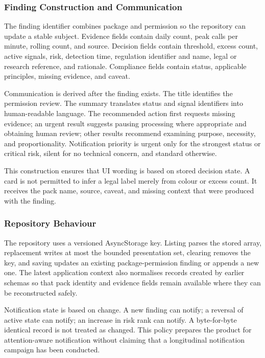 \subsubsection{Finding Construction and Communication}

The finding identifier combines package and permission so the repository can update a stable subject. Evidence fields contain daily count, peak calls per minute, rolling count, and source. Decision fields contain threshold, excess count, active signals, risk, detection time, regulation identifier and name, legal or research reference, and rationale. Compliance fields contain status, applicable principles, missing evidence, and caveat.

Communication is derived after the finding exists. The title identifies the permission review. The summary translates status and signal identifiers into human-readable language. The recommended action first requests missing evidence; an urgent result suggests pausing processing where appropriate and obtaining human review; other results recommend examining purpose, necessity, and proportionality. Notification priority is urgent only for the strongest status or critical risk, silent for no technical concern, and standard otherwise.

This construction ensures that UI wording is based on stored decision state. A card is not permitted to infer a legal label merely from colour or excess count. It receives the pack name, source, caveat, and missing context that were produced with the finding.

\subsubsection{Repository Behaviour}

The repository uses a versioned AsyncStorage key. Listing parses the stored array, replacement writes at most the bounded presentation set, clearing removes the key, and saving updates an existing package-permission finding or appends a new one. The latest application context also normalises records created by earlier schemas so that pack identity and evidence fields remain available where they can be reconstructed safely.

Notification state is based on change. A new finding can notify; a reversal of active state can notify; an increase in risk rank can notify. A byte-for-byte identical record is not treated as changed. This policy prepares the product for attention-aware notification without claiming that a longitudinal notification campaign has been conducted.

